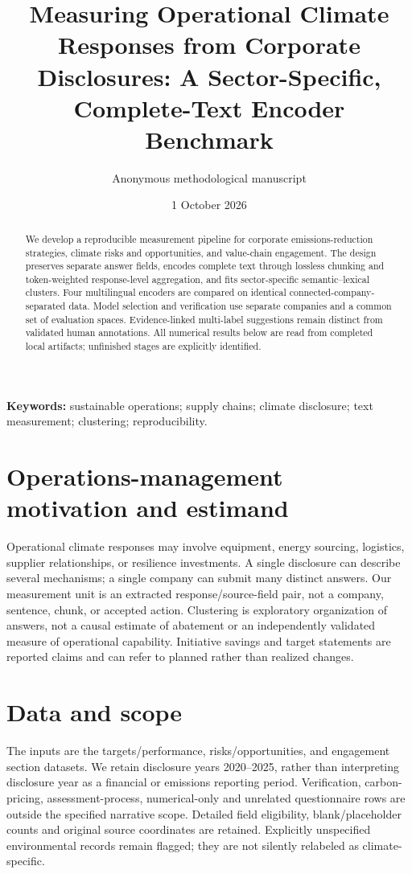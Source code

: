 \documentclass[12pt]{article}
\title{Measuring Operational Climate Responses from Corporate Disclosures:
A Sector-Specific, Complete-Text Encoder Benchmark}
\author{Anonymous methodological manuscript}
\date{1 October 2026}
\begin{document}
\maketitle
\begin{abstract}
We develop a reproducible measurement pipeline for corporate emissions-reduction
strategies, climate risks and opportunities, and value-chain engagement.
The design preserves separate answer fields, encodes complete text through
lossless chunking and token-weighted response-level aggregation, and fits
sector-specific semantic--lexical clusters. Four multilingual encoders are
compared on identical connected-company-separated data. Model selection and
verification use separate companies and a common set of evaluation spaces.
Evidence-linked multi-label suggestions remain distinct from validated human
annotations. All numerical results below are read from completed local artifacts;
unfinished stages are explicitly identified.
\end{abstract}
\noindent\textbf{Keywords:} sustainable operations; supply chains; climate disclosure;
text measurement; clustering; reproducibility.

\section{Operations-management motivation and estimand}
Operational climate responses may involve equipment, energy sourcing, logistics,
supplier relationships, or resilience investments. A single disclosure can
describe several mechanisms; a single company can submit many distinct answers.
Our measurement unit is an extracted response/source-field pair, not a company,
sentence, chunk, or accepted action. Clustering is exploratory organization of
answers, not a causal estimate of abatement or an independently validated measure
of operational capability. Initiative savings and target statements are reported
claims and can refer to planned rather than realized changes.

\section{Data and scope}
The inputs are the targets/performance, risks/opportunities, and engagement
section datasets. We retain disclosure years 2020--2025, rather than interpreting
disclosure year as a financial or emissions reporting period. Verification,
carbon-pricing, assessment-process, numerical-only and unrelated questionnaire
rows are outside the specified narrative scope. Detailed field eligibility,
blank/placeholder counts and original source coordinates are retained.
Explicitly unspecified environmental records remain flagged; they are not
silently relabeled as climate-specific.
\end{document}
